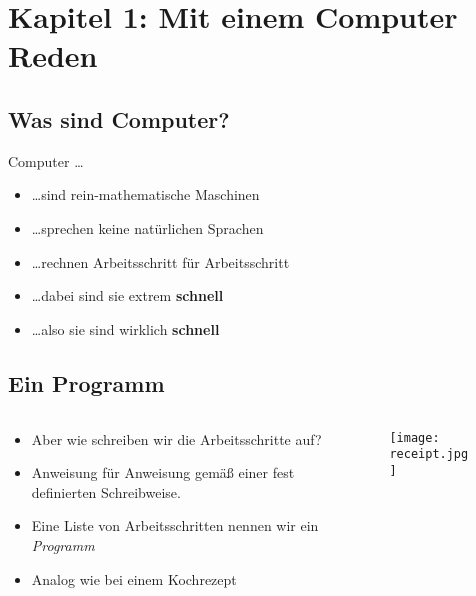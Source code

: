 \section{Kapitel 1: Mit einem Computer Reden}
\subsection{Was sind Computer?}
\begin{frame}
    \slidehead
    Computer \dots
    \begin{itemize}[<+->]
        \item \dots sind rein-mathematische Maschinen
        \item \dots sprechen keine natürlichen Sprachen
        \item \dots rechnen Arbeitsschritt für Arbeitsschritt
        \item \dots dabei sind sie extrem \textbf{schnell}
            \vspace{3em}
        \item \dots also sie sind wirklich \textbf{\Huge schnell}
    \end{itemize}
\end{frame}

\subsection{Ein Programm}
\begin{frame}
    \slidehead
    \begin{columns}
        \begin{column}{ 0.7\textwidth }
            \begin{itemize}[<+->]
                \item Aber wie schreiben wir die Arbeitsschritte auf?
                \item Anweisung für Anweisung gemäß einer fest definierten Schreibweise.
                \item Eine Liste von Arbeitsschritten nennen wir ein \emph{Programm}
                \item Analog wie bei einem Kochrezept
            \end{itemize}
        \end{column}%
        \begin{column}{ 0.3\textwidth }
            \begin{figure}
                \texttt{[image: receipt.jpg]}
            \end{figure}
        \end{column}
    \end{columns}
\end{frame}

